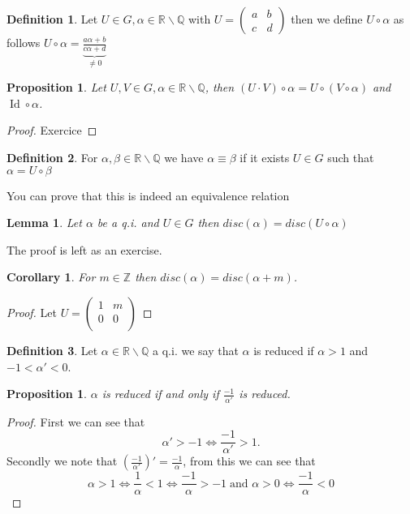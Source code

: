 \documentclass[a4paper,11pt,american]{article}
\newcommand{\Q}{\mathbb{Q}}
\newcommand{\R}{\mathbb{R}}
\newcommand{\Z}{\mathbb{Z}}
\DeclareMathOperator{\Id}{Id}
\theoremstyle{plain}
\newtheorem{lemma}[theorem]{Lemma}
\newtheorem{proposition}[theorem]{Proposition}
\newtheorem{corollary}[theorem]{Corollary}
\theoremstyle{definition}
\newtheorem{definition}{Definition}
\begin{document}
\begin{definition}
    Let $U\in G,\alpha\in\R\backslash\Q$ with $U=\begin{pmatrix}
        a & b\\
        c & d
    \end{pmatrix}$ then we define $U\circ \alpha$ as follows $U\circ \alpha=\underbrace{\frac{a\alpha+b}{c\alpha+d}}_{\neq 0}$
\end{definition}
\begin{proposition}
    Let $U,V\in G,\alpha\in\R\backslash\Q$, then $(U\cdot V)\circ\alpha=U\circ (V\circ \alpha)$ and  $\Id\circ\alpha$.
\end{proposition}
\begin{proof}
    Exercice
\end{proof}
\begin{definition}
    For $\alpha,\beta\in\R\backslash\Q$ we have $\alpha\equiv\beta$ if it exists $U\in G$ such that $\alpha=U\circ\beta$
\end{definition}
You can prove that this is indeed an equivalence relation
\begin{lemma}
    Let $\alpha$ be a q.i. and $U\in G$ then $disc(\alpha)=disc(U\circ \alpha)$
 \end{lemma}
 The proof is left as an exercise.
 \begin{corollary}
     For $m\in\Z$ then $disc(\alpha)=disc(\alpha+m)$.
 \end{corollary}
 \begin{proof}
     Let $U=\begin{pmatrix}
         1 & m\\
         0 & 0\\
         \end{pmatrix}$
 \end{proof}
 \begin{definition}
     Let $\alpha\in\R\backslash\Q$ a q.i. we say that $\alpha$ is reduced if $\alpha>1$ and $-1<\alpha'<0$.
 \end{definition}
 \begin{proposition}
     $\alpha$ is reduced if and only if $\frac{-1}{\alpha'}$ is reduced.
 \end{proposition}
 \begin{proof}
    First we can see that $$\alpha'>-1\iff\frac{-1}{\alpha'}>1.$$
    Secondly we note that $(\frac{-1}{\alpha'})'=\frac{-1}{\alpha}$, from this we can see that 
    $$\alpha>1\iff\frac{1}{\alpha}<1\iff\frac{-1}{\alpha}>-1\;\text{and } \alpha>0\iff\frac{-1}{\alpha}<0$$
 \end{proof}
\end{document}
